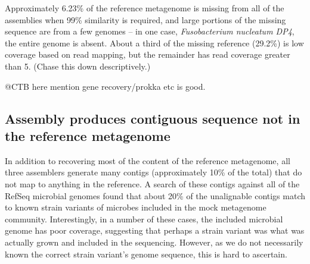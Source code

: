 \documentclass[10pt,a4paper,twocolumn]{article}
\begin{document}
 
Approximately 6.23\% of the reference metagenome is missing from all of
the assemblies when 99\% similarity is required, and large portions of
the missing sequence are from a few genomes -- in one case, {\em
  Fusobacterium nucleatum DP4}, the entire genome is absent.
About a third of the missing reference (29.2\%) is low coverage based on
read mapping, but the remainder has read coverage greater than 5.
(Chase this down descriptively.)




@CTB here mention gene recovery/prokka etc is good.


\subsection*{Assembly produces contiguous sequence not in the reference metagenome}

In addition to recovering most of the content of the reference
metagenome, all three assemblers generate many contigs (approximately
10\% of the total) that do not map to anything in the reference.  A
search of these contigs against all of the RefSeq microbial genomes found
that about 20\% of the unalignable contigs match to known strain
variants of microbes included in the mock metagenome
community.  Interestingly, in a number of these cases, the included
microbial genome has poor coverage, suggesting that perhaps a strain
variant was what was actually grown and included in the sequencing.
However, as we do not necessarily known the correct strain variant's
genome sequence, this is hard to ascertain.
\end{document}
